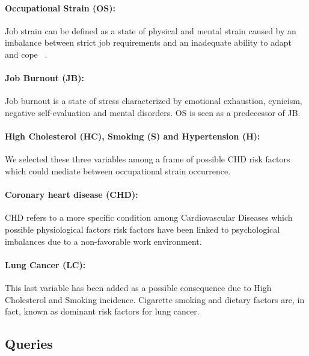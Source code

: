 \paragraph{Occupational Strain (OS):} Job strain can be defined as a state of physical and mental strain caused by an imbalance between strict job requirements and an inadequate ability to adapt and cope ~\cite{ref_article1}. 
\paragraph{Job Burnout (JB):} Job burnout is a state of stress characterized by emotional exhaustion, cynicism, negative self-evaluation and mental disorders. OS is seen as a predecessor of JB. ~\cite{ref_article1}
\paragraph{High Cholesterol (HC), Smoking (S) and Hypertension (H):} We selected these three variables among a frame of possible CHD risk factors which could mediate between occupational strain occurrence. ~\cite{ref_article6}
\paragraph{Coronary heart disease (CHD):} CHD refers to a more specific condition among Cardiovascular Diseases which possible physiological factors risk factors have been linked to psychological imbalances due to a non-favorable work environment.  
\paragraph{Lung Cancer (LC):} This last variable has been added as a possible consequence due to High Cholesterol and Smoking incidence. Cigarette smoking and dietary factors are, in fact, known as dominant risk factors for lung cancer. ~\cite{ref_article8} 

\subsection{Queries}
